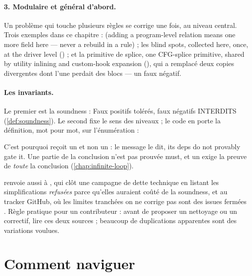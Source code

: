 \paragraph{3. Modulaire et général d'abord.} \og Un problème qui touche plusieurs règles se corrige une fois, au niveau central.\fg{} Trois exemples dans ce chapitre :  (\og adding a program-level relation means one more field here --- never a rebuild in a rule\fg{}) ; les blind spots, \og collected here, once, at the driver level\fg{} () ; et la primitive de splice, \og one CFG-splice primitive, shared by utility inlining and custom-hook expansion\fg{} (), qui a remplacé deux copies divergentes dont l'une perdait des blocs --- un faux négatif.

\paragraph{Les invariants.} Le premier est la soundness : \og Faux positifs tolérés, faux négatifs INTERDITS\fg{} (\cref{def:soundness}). Le second fixe le sens des niveaux ; le code en porte la définition, mot pour mot, sur l'énumération  :


C'est pourquoi  reçoit un \Warning{} et non un \Error{} : le message le dit, \og its deps do not provably gate it\fg{}. Une partie de la conclusion n'est pas prouvée must, et un \Error{} exige la preuve de \emph{toute} la conclusion (\cref{chap:infinite-loop}).

\begin{decision}[ADR-20]
 renvoie aussi à , qui clôt une campagne de dette technique en listant les simplifications \emph{refusées} parce qu'elles auraient coûté de la soundness, et au tracker GitHub, où les limites tranchées \og on ne corrige pas\fg{} sont des issues fermées . Règle pratique pour un contributeur : avant de proposer un nettoyage ou un correctif, lire ces deux sources ; beaucoup de \og duplications\fg{} apparentes sont des variations voulues.
\end{decision}

\section{Comment naviguer}
\label{sec:tour-architecture-naviguer}

